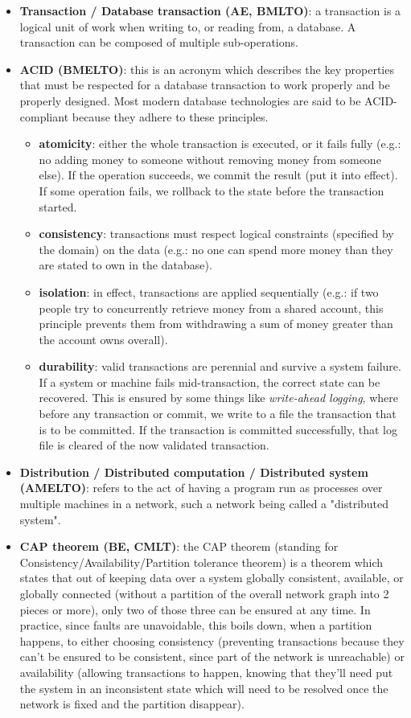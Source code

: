 \documentclass{article}
\begin{document}
\begin{itemize}
	\item \textbf{Transaction / Database transaction (AE, BMLTO)}: a transaction is a logical unit of work when writing to, or reading from, a database. A transaction can be composed of multiple sub-operations.

	\item \textbf{ACID (BMELTO)}: this is an acronym which describes the key properties that must be respected for a database transaction to work properly and be properly designed. Most modern database technologies are said to be ACID-compliant because they adhere to these principles.
	\begin{itemize}
		\item \textbf{atomicity}: either the whole transaction is executed, or it fails fully (e.g.: no adding money to someone without removing money from someone else). If the operation succeeds, we commit the result (put it into effect). If some operation fails, we rollback to the state before the transaction started.
		\item \textbf{consistency}: transactions must respect logical constraints (specified by the domain) on the data (e.g.: no one can spend more money than they are stated to own in the database).
		\item \textbf{isolation}: in effect, transactions are applied sequentially (e.g.: if two people try to concurrently retrieve money from a shared account, this principle prevents them from withdrawing a sum of money greater than the account owns overall).
		\item \textbf{durability}: valid transactions are perennial and survive a system failure. If a system or machine fails mid-transaction, the correct state can be recovered. This is ensured by some things like \textit{write-ahead logging}, where before any transaction or commit, we write to a file the transaction that is to be committed. If the transaction is committed successfully, that log file is cleared of the now validated transaction.
	\end{itemize}

	\item \textbf{Distribution / Distributed computation / Distributed system (AMELTO)}: refers to the act of having a program run as processes over multiple machines in a network, such a network being called a "distributed system".

	\item \textbf{CAP theorem (BE, CMLT)}: the CAP theorem (standing for Consistency/Availability/Partition tolerance theorem) is a theorem which states that out of keeping data over a system globally consistent, available, or globally connected (without a partition of the overall network graph into 2 pieces or more), only two of those three can be ensured at any time. In practice, since faults are unavoidable, this boils down, when a partition happens, to either choosing consistency (preventing transactions because they can't be ensured to be consistent, since part of the network is unreachable) or availability (allowing transactions to happen, knowing that they'll need put the system in an inconsistent state which will need to be resolved once the network is fixed and the partition disappear).


\end{itemize}
\end{document}
